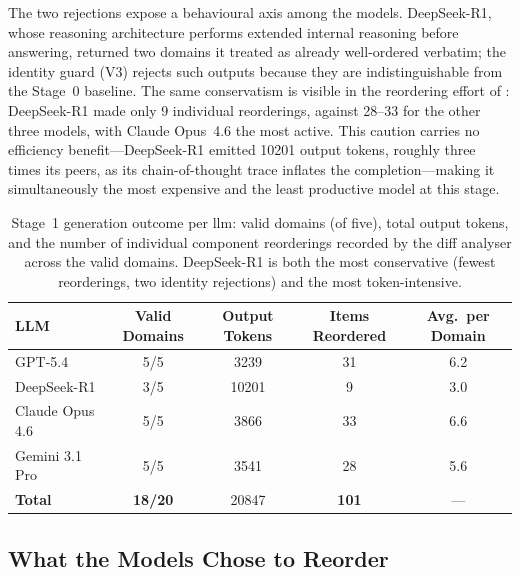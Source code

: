 The two rejections expose a behavioural axis among the models. DeepSeek-R1, whose reasoning architecture performs extended internal reasoning before answering, returned two domains it treated as already well-ordered verbatim; the identity guard (V3) rejects such outputs because they are indistinguishable from the Stage~0 baseline. The same conservatism is visible in the reordering effort of : DeepSeek-R1 made only 9 individual reorderings, against 28--33 for the other three models, with Claude Opus~4.6 the most active. This caution carries no efficiency benefit---DeepSeek-R1 emitted \num{10201} output tokens, roughly three times its peers, as its chain-of-thought trace inflates the completion---making it simultaneously the most expensive and the least productive model at this stage.

\begin{table}[htbp]
  \centering
  \caption{Stage~1 generation outcome per \gls{llm}: valid domains (of five), total output tokens, and the number of individual component reorderings recorded by the diff analyser across the valid domains. DeepSeek-R1 is both the most conservative (fewest reorderings, two identity rejections) and the most token-intensive.}
  \label{tab:s1_generation}
  \small
  \begin{tabular}{l c c c c}
    \toprule
    \textbf{LLM} & \textbf{Valid Domains} & \textbf{Output Tokens} & \textbf{Items Reordered} & \textbf{Avg.\ per Domain} \\
    \midrule
    GPT-5.4          & 5/5 & \num{3239}  & 31 & 6.2 \\
    DeepSeek-R1      & 3/5 & \num{10201} & 9  & 3.0 \\
    Claude Opus 4.6  & 5/5 & \num{3866}  & 33 & 6.6 \\
    Gemini 3.1 Pro   & 5/5 & \num{3541}  & 28 & 5.6 \\
    \midrule
    \textbf{Total}   & \textbf{18/20} & \num{20847} & \textbf{101} & --- \\
    \bottomrule
  \end{tabular}
\end{table}

\subsection{What the Models Chose to Reorder}
\label{sec:results:stage1:reordering}

